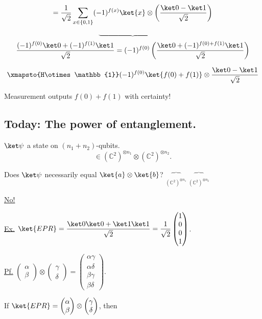 \documentclass[11pt]{article}
\begin{document}
\[
= \frac{1}{\sqrt2}\sum_{x\in\{0,1\}} (-1)^{f(x)}\ket{x}\otimes\left(\frac{\ket0-\ket1}{\sqrt2}\right)
\]

\[
\underbrace{\hspace{4cm}}
\]
\[
\frac{(-1)^{f(0)}\ket0 + (-1)^{f(1)}\ket1}{\sqrt2}
= (-1)^{f(0)}\left(\frac{\ket0 + (-1)^{f(0)+f(1)}\ket1}{\sqrt2}\right)
\]

\[
\xmapsto{H\otimes\mathbb{1}} (-1)^{f(0)}\ket{f(0)+f(1)} \otimes \frac{\ket0-\ket1}{\sqrt2}
\]

Measurement outputs $f(0)+f(1)$ with certainty!

\subsection*{Today: The power of entanglement.}

$\ket\psi$ a state on $(n_1+n_2)$-qubits.
\[
\in (\mathbb{C}^2)^{\otimes n_1} \otimes (\mathbb{C}^2)^{\otimes n_2}.
\]

Does $\ket\psi$ necessarily equal $\ket{a}\otimes\ket{b}$? \hfill $\underset{(\mathbb{C}^2)^{\otimes n_1}}{\overbrace{\phantom{xx}}} \; \underset{(\mathbb{C}^2)^{\otimes n_2}}{\overbrace{\phantom{xx}}}$

\underline{No!}

\underline{Ex.} $\ket{EPR} = \dfrac{\ket0\ket0+\ket1\ket1}{\sqrt2} = \dfrac{1}{\sqrt2}\begin{pmatrix}1\\0\\0\\1\end{pmatrix}$.

\underline{Pf.} $\begin{pmatrix}\alpha\\\beta\end{pmatrix}\otimes\begin{pmatrix}\gamma\\\delta\end{pmatrix} = \begin{pmatrix}\alpha\gamma\\\alpha\delta\\\beta\gamma\\\beta\delta\end{pmatrix}$.

If $\ket{EPR} = \begin{pmatrix}\alpha\\\beta\end{pmatrix}\otimes\begin{pmatrix}\gamma\\\delta\end{pmatrix}$, then
\end{document}
